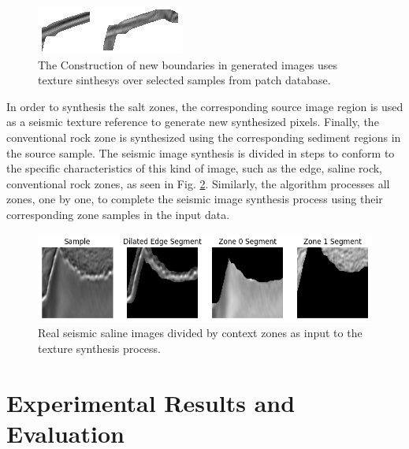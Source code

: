 \documentclass{ieeeaccess}
\providecommand{\DIFaddbeginFL}{} %
\providecommand{\DIFaddendFL}{} %
\providecommand{\DIFdelbeginFL}{} %
\providecommand{\DIFdelendFL}{} %
\newcommand{\DIFscaledelfig}{0.5}
\newlength{\DIFdelgraphicswidth} %
\newlength{\DIFdelgraphicsheight} %
\newcommand{\DIFaddincludegraphics}[2][]{{\color{blue}\fbox{\DIFOincludegraphics[#1]{#2}}}} %
\newcommand{\DIFdelincludegraphics}[2][]{%
\sbox{\DIFdelgraphicsbox}{\DIFOincludegraphics[#1]{#2}}%
\settoboxwidth{\DIFdelgraphicswidth}{\DIFdelgraphicsbox} %
\settoboxtotalheight{\DIFdelgraphicsheight}{\DIFdelgraphicsbox} %
\scalebox{\DIFscaledelfig}{%
\parbox[b]{\DIFdelgraphicswidth}{\usebox{\DIFdelgraphicsbox}\\[-\baselineskip] \rule{\DIFdelgraphicswidth}{0em}}\llap{\resizebox{\DIFdelgraphicswidth}{\DIFdelgraphicsheight}{%
\setlength{\unitlength}{\DIFdelgraphicswidth}%
\begin{picture}(1,1)%
\thicklines\linethickness{2pt} %
{\color[rgb]{1,0,0}\put(0,0){\framebox(1,1){}}}%
{\color[rgb]{1,0,0}\put(0,0){\line( 1,1){1}}}%
{\color[rgb]{1,0,0}\put(0,1){\line(1,-1){1}}}%
\end{picture}%
}\hspace*{3pt}}} %
} %
\DeclareRobustCommand{\DIFaddbeginFL}{\DIFOaddbeginFL \let\includegraphics\DIFaddincludegraphics} %
\DeclareRobustCommand{\DIFaddendFL}{\DIFOaddendFL \let\includegraphics\DIFOincludegraphics} %
\DeclareRobustCommand{\DIFdelbeginFL}{\DIFOdelbeginFL \let\includegraphics\DIFdelincludegraphics} %
\DeclareRobustCommand{\DIFdelendFL}{\DIFOaddendFL \let\includegraphics\DIFOincludegraphics} %
\begin{document}
\begin{figure}
        \centering
        \DIFdelbeginFL %
\DIFdelendFL \DIFaddbeginFL \includegraphics[width=1\linewidth]{images/edge3.jpg}
        \DIFaddendFL \caption{The Construction of new boundaries in generated images uses  texture sinthesys over selected samples from patch database.}
        \label{fig:edge2}
    \end{figure}    

In order to synthesis the salt zones, the corresponding source image region is used as a seismic texture reference to generate new synthesized pixels. Finally, the conventional rock zone is synthesized using the corresponding sediment regions in the source sample. The seismic image synthesis is divided in steps to conform to the specific characteristics of this kind of image, such as the edge, saline rock, conventional rock zones, as seen in Fig. \ref{fig:source1}. Similarly, the algorithm processes all zones, one by one, to complete the seismic image synthesis process using their corresponding zone samples in the input data.

\begin{figure}
    \centering
    \includegraphics[width=1\linewidth]{images/2.png}
    \caption{Real seismic saline images divided by context zones as input to the texture synthesis process.}
    \label{fig:source1}
\end{figure}


\section{Experimental Results and Evaluation}
\end{document}
